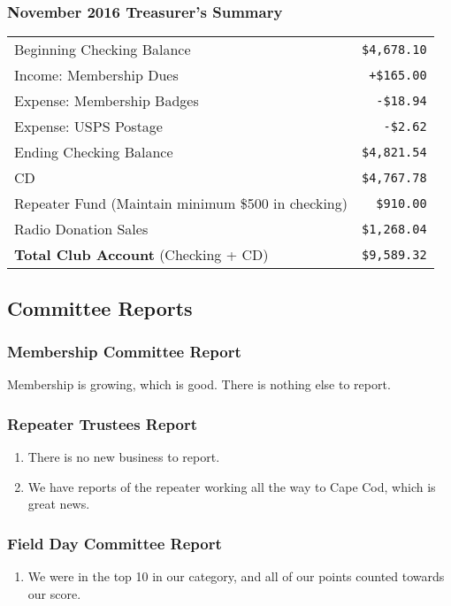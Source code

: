 \documentclass[10pt,letterpaper]{article}
\begin{document}
\subsubsection{November 2016 Treasurer's Summary}
\noindent
\begin{tabular}{|l|r|}
  \hline
  Beginning Checking Balance & \texttt{\$4,678.10} \\
  Income: Membership Dues & \texttt{+\$165.00} \\
  Expense: Membership Badges & \texttt{-\$18.94} \\
  Expense: USPS Postage & \texttt{-\$2.62} \\
  Ending Checking Balance & \texttt{\$4,821.54} \\
  \hline
  \hline
  CD & \texttt{\$4,767.78} \\
  \hline
  \hline
  Repeater Fund (Maintain minimum \$500 in checking) & \texttt{\$910.00} \\
  \hline
  \hline
  Radio Donation Sales & \texttt{\$1,268.04} \\
  \hline
  \hline
  \textbf{Total Club Account} (Checking + CD) & \texttt{\$9,589.32} \\
  \hline
\end{tabular}

\subsection{Committee Reports}

\subsubsection{Membership Committee Report}
Membership is growing, which is good. There is nothing else to report.

\subsubsection{Repeater Trustees Report}
\begin{enumerate}
\item There is no new business to report.
\item We have reports of the repeater working all the way to Cape Cod, which is great news.
\end{enumerate}

\subsubsection{Field Day Committee Report}
\begin{enumerate}
\item We were in the top 10 in our category, and all of our points counted towards our score.
\end{enumerate}
\end{document}
